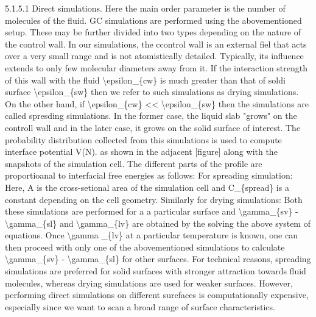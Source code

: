 \par 5.1.5.1 Direct simulations. Here the main order parameter is the number of molecules of the fluid. GC simulations are performed using the abovementioned setup. These may be further divided into two types depending on the nature of the control wall. In our simulations, the ccontrol wall is an external fiel that acts over a very small range and is not atomistically detailed.  Typically, its influence extends to only few molecular diameters away from it. If the interaction strength of this wall with the fluid \textbackslash epsilon\_\{cw\} is much greater than that of soldi surface \textbackslash epsilon\_\{sw\} then we refer to such simulations as drying simulations. On the other hand, if \textbackslash epsilon\_\{cw\} << \textbackslash epsilon\_\{sw\} then the simulations are called spresding simulations. In the former case, the liquid slab "grows" on the controll wall and in the later case, it grows on the solid surface of interest. The probability distribution collected from this simulations is used to compute interface potential V(N).  as shown in the adjacent [figure] along with the snapshots of the simulation cell. The different parts of the profile are proportioanal to interfacial free energies as follows: For spreading simulation: Here, A is the cross-setional area of the simulation cell and C\_\{spread\} is a constant depending on the cell geometry.  Similarly for drying simulations: Both these simulations are performed for a a particular surface and \textbackslash gamma\_\{sv\} - \textbackslash gamma\_\{sl\} and \textbackslash gamma\_\{lv\} are obtained by the solving the above system of equations. Once \textbackslash gamma \_\{lv\} at a particular temperature is known, one can then proceed with only one of the abovementioned simulations to calculate \textbackslash gamma\_\{sv\} - \textbackslash gamma\_\{sl\} for other surfaces. For technical reasons, spreading simulations are preferred for solid surfaces with stronger attraction towards fluid molecules, whereas drying simulations are used for weaker surfaces. However, performing direct simulations on different surefaces is computationally expensive, especially since we want to scan a broad range of surface characteristics.
